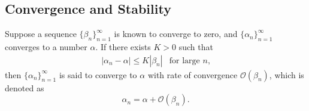 \subsection{Convergence and Stability}
\begin{definition}[Convergence]
Suppose a sequence $\{\beta_n\}_{n=1}^\infty$ is known to converge to zero, and $\{\alpha_n\}_{n=1}^\infty$ converges to a number $\alpha$. If there exists $K>0$ such that
\[
\begin{array}{ll}
|\alpha_n - \alpha|\le K|\beta_n|
&
\mbox{for large $n$,}
\end{array}
\]
then $\{\alpha_n\}_{n=1}^\infty$ is said to converge to $\alpha$ with rate of convergence $\mathcal{O}(\beta_n)$, which is denoted as
\[
\alpha_n = \alpha + \mathcal{O}(\beta_n).
\]
\end{definition}












